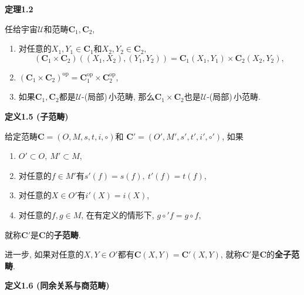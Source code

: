 \documentclass[UTF8]{ctexart}
\begin{document}
\vspace{10pt}

\hypertarget{sec:定理1.2}{}
\noindent\textbf{定理1.2}

任给宇宙$\mathcal{U}$和范畴$\mathbf{C}_1,\mathbf{C}_2$,
\begin{enumerate}
    \item 对任意的$X_1,Y_1\in\mathbf{C}_1$和$X_2,Y_2\in\mathbf{C}_2$,
    \vspace{-3pt}
    \[
        (\mathbf{C}_1\times\mathbf{C}_2)((X_1,X_2),(Y_1,Y_2))=
        \mathbf{C}_1(X_1,Y_1)\times\mathbf{C}_2(X_2,Y_2),
    \]
    \item $(\mathbf{C}_1\times\mathbf{C}_2)^{\mathrm{op}}=
    \mathbf{C}_1^{\mathrm{op}}\times\mathbf{C}_2^{\mathrm{op}}$,
    \item 如果$\mathbf{C}_1,\mathbf{C}_2$都是$\mathcal{U}$-(局部)\,\!小范畴,
    那么$\mathbf{C}_1\times\mathbf{C}_2$也是$\mathcal{U}$-(局部)\,\!小范畴.
\end{enumerate}

\vspace{10pt}

\hypertarget{sec:定义1.5}{}
\noindent\textbf{定义1.5 (子范畴)}

给定范畴$\mathbf{C}=(O,M,s,t,i,\circ)$和
$\mathbf{C}'=(O',M',s',t',i',\circ')$, 如果
\begin{enumerate}
    \item $O'\subset O,\ M'\subset M$,
    \item 对任意的$f\in M'$有$s'(f)=s(f),\ t'(f)=t(f)$,
    \item 对任意的$X\in O'$有$i'(X)=i(X)$,
    \item 对任意的$f,g\in M$, 在有定义的情形下, $g\circ'f=g\circ f$,
\end{enumerate}
就称$\mathbf{C}'$是$\mathbf{C}$的\textbf{子范畴}.

进一步, 如果对任意的$X,Y\in O'$都有$\mathbf{C}(X,Y)=\mathbf{C}'(X,Y)$,
就称$\mathbf{C}'$是$\mathbf{C}$的\textbf{全子范畴}.

\vspace{10pt}

\hypertarget{sec:定义1.6}{}
\noindent\textbf{定义1.6 (同余关系与商范畴)}
\end{document}
